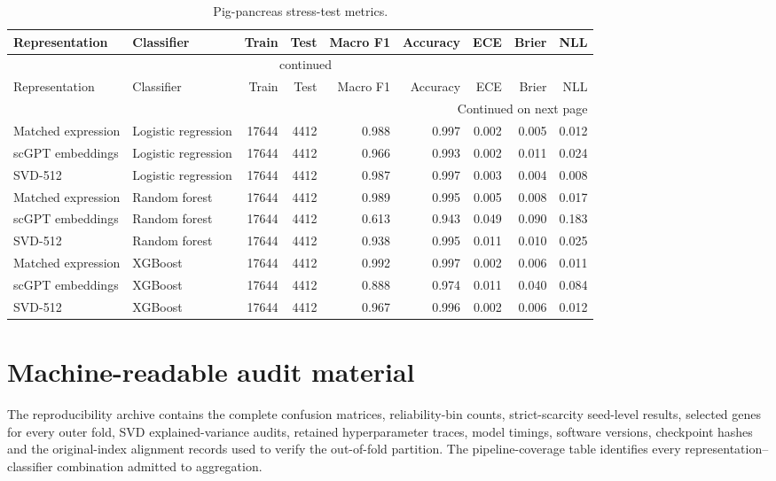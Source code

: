 {\footnotesize\setlength{\tabcolsep}{3pt}
\begin{longtable}{llrrrrrrr}
\caption{Pig-pancreas stress-test metrics.}\label{tab:s-pig}\\
\toprule
Representation & Classifier & Train & Test & Macro F1 & Accuracy & ECE & Brier & NLL \\
\midrule
\endfirsthead
\multicolumn{9}{c}{\tablename\ \thetable{} continued}\\
\toprule
Representation & Classifier & Train & Test & Macro F1 & Accuracy & ECE & Brier & NLL \\
\midrule
\endhead
\midrule
\multicolumn{9}{r}{Continued on next page}\\
\endfoot
\bottomrule
\endlastfoot
Matched expression & Logistic regression & 17644 & 4412 & 0.988 & 0.997 & 0.002 & 0.005 & 0.012 \\
scGPT embeddings & Logistic regression & 17644 & 4412 & 0.966 & 0.993 & 0.002 & 0.011 & 0.024 \\
SVD-512 & Logistic regression & 17644 & 4412 & 0.987 & 0.997 & 0.003 & 0.004 & 0.008 \\
Matched expression & Random forest & 17644 & 4412 & 0.989 & 0.995 & 0.005 & 0.008 & 0.017 \\
scGPT embeddings & Random forest & 17644 & 4412 & 0.613 & 0.943 & 0.049 & 0.090 & 0.183 \\
SVD-512 & Random forest & 17644 & 4412 & 0.938 & 0.995 & 0.011 & 0.010 & 0.025 \\
Matched expression & XGBoost & 17644 & 4412 & 0.992 & 0.997 & 0.002 & 0.006 & 0.011 \\
scGPT embeddings & XGBoost & 17644 & 4412 & 0.888 & 0.974 & 0.011 & 0.040 & 0.084 \\
SVD-512 & XGBoost & 17644 & 4412 & 0.967 & 0.996 & 0.002 & 0.006 & 0.012 \\
\end{longtable}
}

\clearpage\section{Machine-readable audit material}

The reproducibility archive contains the complete confusion matrices, reliability-bin counts, strict-scarcity seed-level results, selected genes for every outer fold, SVD explained-variance audits, retained hyperparameter traces, model timings, software versions, checkpoint hashes and the original-index alignment records used to verify the out-of-fold partition. The pipeline-coverage table identifies every representation--classifier combination admitted to aggregation.
